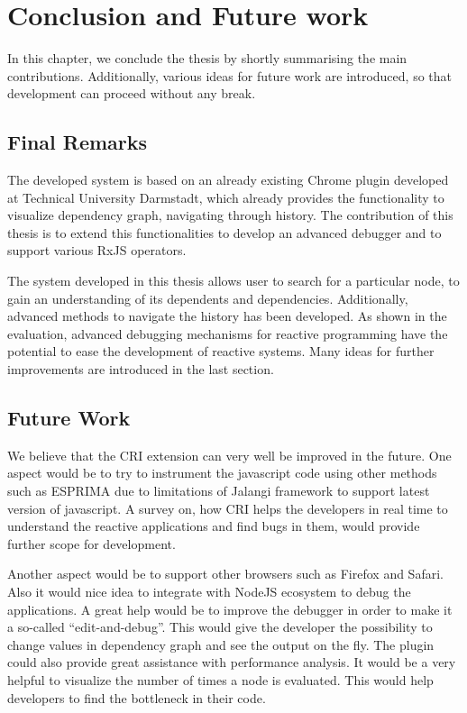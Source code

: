 \chapter{Conclusion and Future work} \label{chap:Summary}
In this chapter, we conclude the thesis by shortly summarising the main contributions. Additionally, various ideas for future work are introduced, so that development can proceed without any break. 

\section{Final Remarks}
The developed system is based on an already existing Chrome plugin developed at Technical University Darmstadt, which already provides the functionality to visualize dependency graph, navigating through history. The contribution of this thesis is to extend this functionalities to develop an advanced debugger and to support various RxJS operators.

The system developed in this thesis allows user to search for a particular node, to gain an understanding of its dependents and dependencies. Additionally, advanced methods to navigate the history has been developed. As shown in the evaluation, advanced debugging mechanisms for reactive programming have the potential to ease the development of reactive systems. Many ideas for further improvements are introduced in the last section.

\section{Future Work}
We believe that the CRI extension can very well be improved in the future. One aspect would be to try to instrument the javascript code using other methods such as ESPRIMA\cite{esprima} due to limitations of Jalangi framework to support latest version of javascript. A survey on, how CRI helps the developers in real time to understand the reactive applications and find bugs in them, would provide further scope for development. 

Another aspect would be to support other browsers such as Firefox and Safari. Also it would nice idea to integrate with NodeJS\cite{nodejs} ecosystem to debug the applications. A great help would be to improve the debugger in order to make it a so-called ``edit-and-debug''. This would give the developer the possibility to change values in dependency graph and see the output on the fly. The plugin could also provide great assistance with performance analysis. It would be a very helpful to visualize the number of times a node is evaluated. This would help developers to find the bottleneck in their code. 